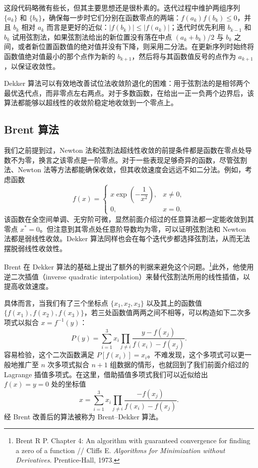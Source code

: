 这段代码略微有些长，但其主要思想还是很朴素的。迭代过程中维护两组序列 $\{a_k\}$ 和 $\{b_k\}$，确保每一步时它们分别在函数零点的两端：$f(a_k)f(b_k)\le0$，并且 $b_k$ 相对 $a_k$ 而言是更好的近似：$|f(b_k)|\le|f(a_k)|$；迭代时优先利用 $b_{k-1}$ 和 $b_k$ 试用弦割法，如果弦割法给出的新位置没有落在中点 $(a_k+b_k)/2$ 与 $b_k$ 之间，或者新位置函数值的绝对值并没有下降，则采用二分法。在更新序列时始终将函数值绝对值最小的那个点作为新的 $b_{k+1}$，然后将与其函数值反号的点作为 $a_{k+1}$，以保证收敛性。

Dekker 算法可以有效地改善试位法收敛阶退化的困难：用于弦割法的是相邻两个最优迭代点，而非零点左右两点。对于多数函数，在给出一正一负两个边界后，该算法都能够以超线性的收敛阶稳定地收敛到一个零点上。

\subsection{Brent 算法}

我们之前提到过，Newton 法和弦割法超线性收敛的前提条件都是函数在零点处导数不为零，换言之该零点是一阶零点。对于一些表现足够奇异的函数，尽管弦割法、Newton 法等方法都能确保收敛，但其收敛速度会远远不如二分法。例如，考虑函数
\begin{equation}
f(x)=\begin{cases}
x\exp\left(-\dfrac1{x^2}\right),&x\ne0,\\[0.8ex]
0,&x=0.
\end{cases}
\tag{2.4.2}
\end{equation}
该函数在全空间单调、无穷阶可微，显然前面介绍过的任意算法都一定能收敛到其零点 $x^*=0$。但注意到其零点处任意阶导数均为零，可以证明弦割法和 Newton 法都是弱线性收敛。Dekker 算法同样也会在每个迭代步都选择弦割法，从而无法摆脱弱线性收敛性。

Brent 在 Dekker 算法的基础上提出了额外的判据来避免这个问题。\footnote{Brent R P. Chapter 4: An algorithm with guaranteed convergence for finding a zero of a function // Cliffs E. \textit{Algorithms for Minimization without Derivatives}. Prentice-Hall, 1973.}此外，他使用逆二次插值（inverse quadratic interpolation）来替代弦割法所用的线性插值，以提高收敛速度。

具体而言，当我们有了三个坐标点 $\{x_1,x_2,x_3\}$ 以及其上的函数值 $\{f(x_1),f(x_2),f(x_3)\}$，若三处函数值两两之间不相等，可以构造如下二次多项式以拟合 $x=f^{-1}(y)$：
\begin{equation}
P(y)=\sum_{i=1}^{3}x_i\prod_{j\ne i}\frac{y-f(x_j)}{f(x_i)-f(x_j)}.
\tag{2.4.3}
\end{equation}
容易检验，这个二次函数满足 $P[f(x_i)]=x_i$。不难发现，这个多项式可以更一般地推广至 $n$ 次多项式拟合 $n+1$ 组数据的情形，也就回到了我们前面介绍过的 Lagrange 插值多项式。在这里，借助插值多项式我们可以近似给出 $f(x)=y=0$ 处的坐标值
\begin{equation}
x=\sum_{i=1}^{3}x_i\prod_{j\ne i}\frac{-f(x_j)}{f(x_i)-f(x_j)}.
\tag{2.4.4}
\end{equation}
经 Brent 改善后的算法被称为 Brent--Dekker 算法。

